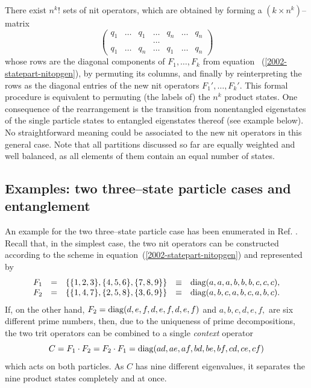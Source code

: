 \documentclass{article}
\begin{document}
There exist $n^k!$  sets of nit operators,
which are obtained by forming a $(k \times n^k)$--matrix
\begin{equation}
\left(
\begin{array}{ccccccccccccccccccccc}
q_1&\ldots &q_1 &\ldots &q_n&\ldots &q_n\\
&&&\ldots &&&\\
q_1&\ldots &q_n &\ldots &q_1&\ldots &q_n
\end{array}
\right)
\label{2003-garda1}
\end{equation}
whose rows are the diagonal components of $F_1,\ldots,F_k$  from equation~
(\ref{2002-statepart-nitopgen}),
by permuting its columns, and finally by reinterpreting the rows as the diagonal entries of the new nit operators
$F_1',\ldots,F_k'$.
This formal procedure is equivalent to permuting (the labels of) the $n^k$ product states.
One consequence of the rearrangement
is the transition from nonentangled eigenstates of the single particle states to entangled eigenstates thereof
(see example below).
No straightforward meaning could be associated to the new nit operators in this general case.
Note that all partitions discussed so far are equally weighted and well balanced,
as all elements of them contain an equal number of states.

\subsection{Examples: two three--state particle cases and entanglement}

An example for the two three--state particle case has been enumerated in
Ref. \cite{svozil-2002-statepart-prl}.
Recall that, in the simplest case, the two nit operators can be constructed according to
the scheme in equation~(\ref{2002-statepart-nitopgen}) and represented by
\begin{equation}
\begin{array}{llllll}
F_1&=&\{\{1,2,3\},\{4,5,6\},\{7,8,9\}\}&\equiv& {\rm diag} (a,a,a,b,b,b,c,c,c),\\
F_2&=&\{\{1,4,7\},\{2,5,8\},\{3,6,9\}\}&\equiv& {\rm diag} (a,b,c,a,b,c,a,b,c).\\
\end{array}
\label{2002-statepart-ps3e}
\end{equation}
If, on the other hand, $F_2= {\rm diag} (d,e,f,d,e,f,d,e,f)$
and $a,b,c,d,e,f,$ are six different prime numbers,
then, due to the uniqueness of prime decompositions,
the two trit operators
can be combined to a single
{\em context} operator
\begin{equation}
C=F_1\cdot F_2=F_2\cdot F_1=
{\rm diag} (ad,ae,af,bd,be,bf,cd,ce,cf)
\label{2002-statepart-ps3pd}
\end{equation}
which acts on both particles.
As $C$ has nine different eigenvalues, it separates the nine product states
completely and at once.
\end{document}
